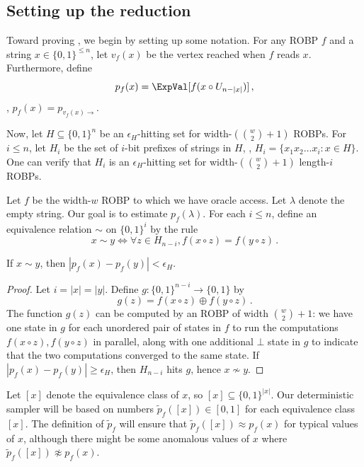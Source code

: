 \subsection{Setting up the reduction}
Toward proving , we begin by setting up some notation. For any ROBP $f$ and a string $x \in \{0, 1\}^{\leq n}$, let $v_f(x)$ be the vertex reached when $f$ reads $x$. Furthermore, define
$$
p_f(x) = \ExpVal[f(x \circ U_{n - |x|})]\,,
$$
\ie, $p_f(x) = p_{v_f(x) \to}$.

Now, let $H \subseteq \{0, 1\}^n$ be an $\epsilon_H$-hitting set for width-$(\binom{w}{2} + 1)$ ROBPs. For $i \leq n$, let $H_i$ be the set of $i$-bit prefixes of strings in $H$, \ie, $H_i = \{x_1 x_2 \dots x_i : x \in H\}$. One can verify that $H_i$ is an $\epsilon_H$-hitting set for width-$(\binom{w}{2} + 1)$ length-$i$ ROBPs.

Let $f$ be the width-$w$ ROBP to which we have oracle access. Let $\lambda$ denote the empty string. Our goal is to estimate $p_f(\lambda)$. For each $i \leq n$, define an equivalence relation $\sim$ on $\{0, 1\}^i$ by the rule
$$
x \sim y \iff \forall z \in H_{n - i}, f(x \circ z) = f(y \circ z)\,.
$$
\begin{lemma} \label{lem:equiv}
If $x \sim y$, then $|p_f(x) - p_f(y)| < \epsilon_H$.
\end{lemma}

\begin{proof}
Let $i = |x| = |y|$. Define $g \colon \{0, 1\}^{n - i} \to \{0, 1\}$ by
$$
g(z) = f(x \circ z) \oplus f(y \circ z)\,.
$$
The function $g(z)$ can be computed by an ROBP of width $\binom{w}{2} + 1$: we have one state in $g$ for each unordered pair of states in $f$ to run the computations $f(x \circ z), f(y \circ z)$ in parallel, along with one additional $\bot$ state in $g$ to indicate that the two computations converged to the same state. If $|p_f(x) - p_f(y)| \geq \epsilon_H$, then $H_{n - i}$ hits $g$, hence $x \not \sim y$.
\end{proof}

Let $[x]$ denote the equivalence class of $x$, so $[x] \subseteq \{0, 1\}^{|x|}$. Our deterministic sampler will be based on numbers $\widetilde{p}_f([x]) \in [0, 1]$ for each equivalence class $[x]$. The definition of $\widetilde{p}_f$ will ensure that $\widetilde{p}_f([x]) \approx p_f(x)$ for typical values of $x$, although there might be some anomalous values of $x$ where $\widetilde{p}_f([x]) \not \approx p_f(x)$.

